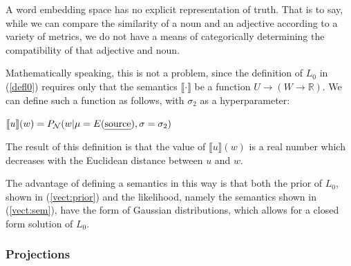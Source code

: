 \documentclass[OpenMind]{stjour}
\newcommand{\Listener}{L}
\newcommand{\QLONE}{\Listener_{{1}}^{{Q}}}
\begin{document}

		A word embedding space has no explicit representation of truth. That is to say, while we can compare the similarity of a noun and an adjective according to a variety of metrics, we do not have a means of categorically determining the compatibility of that adjective and noun.

		Mathematically speaking, this is not a problem, since the definition of $L_0$ in (\ref{defl0}) requires only that the semantics $\llbracket \cdot \rrbracket$ be a function $U\to (W\to \mathbb{R})$. We can define such a function as follows, with $\sigma_2$ as a hyperparameter:




		\begin{exe}
		\vspace{-1em}
		\ex $\llbracket u\rrbracket(w) = P_{\mathcal{N}}(w\vert\mu=E(\textrm{\emph{source}}),\sigma=\sigma_2)$ \label{vect:sem}
		\end{exe}

		The result of this definition is that the value of $\llbracket u\rrbracket(w)$ is a real number which decreases with the Euclidean distance between $u$ and $w$. 

		The advantage of defining a semantics in this way is that both the prior of $L_0$, shown in (\ref{vect:prior}) and the likelihood, namely the semantics shown in (\ref{vect:sem}), have the form of Gaussian distributions, which allows for a closed form solution of $L_0$. 

	\subsubsection{Projections} 
\end{document}
